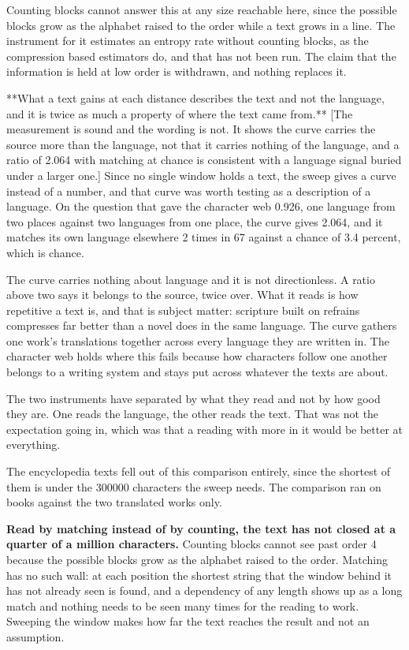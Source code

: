 Counting blocks cannot answer this at any size reachable here, since the possible blocks grow as the alphabet raised to the order while a text grows in a line. The instrument for it estimates an entropy rate without counting blocks, as the compression based estimators do, and that has not been run. The claim that the information is held at low order is withdrawn, and nothing replaces it.

**What a text gains at each distance describes the text and not the language, and it is twice as much a property of where the text came from.** [The measurement is sound and the wording is not. It shows the curve carries the source more than the language, not that it carries nothing of the language, and a ratio of 2.064 with matching at chance is consistent with a language signal buried under a larger one.] Since no single window holds a text, the sweep gives a curve instead of a number, and that curve was worth testing as a description of a language. On the question that gave the character web 0.926, one language from two places against two languages from one place, the curve gives 2.064, and it matches its own language elsewhere 2 times in 67 against a chance of 3.4 percent, which is chance.

The curve carries nothing about language and it is not directionless. A ratio above two says it belongs to the source, twice over. What it reads is how repetitive a text is, and that is subject matter: scripture built on refrains compresses far better than a novel does in the same language. The curve gathers one work's translations together across every language they are written in. The character web holds where this fails because how characters follow one another belongs to a writing system and stays put across whatever the texts are about.

The two instruments have separated by what they read and not by how good they are. One reads the language, the other reads the text. That was not the expectation going in, which was that a reading with more in it would be better at everything.

The encyclopedia texts fell out of this comparison entirely, since the shortest of them is under the 300000 characters the sweep needs. The comparison ran on books against the two translated works only.

\textbf{Read by matching instead of by counting, the text has not closed at a quarter of a million characters.} Counting blocks cannot see past order 4 because the possible blocks grow as the alphabet raised to the order. Matching has no such wall: at each position the shortest string that the window behind it has not already seen is found, and a dependency of any length shows up as a long match and nothing needs to be seen many times for the reading to work. Sweeping the window makes how far the text reaches the result and not an assumption.

